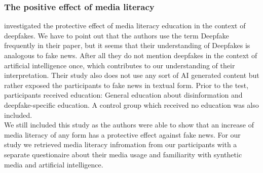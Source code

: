 \documentclass[
  a4paper,  %
  twoside,  %
  bibliography=totoc,
  headsepline,
  cleardoublepage=empty,
  parskip=half,
  draft=false
]{scrbook}
\begin{document}
\subsubsection*{The positive effect of media literacy}
\citeauthor{hwangEffectsDisinformationUsing2021} investigated the protective effect of media literacy education in the context of deepfakes. We have to point out that the authors use the term Deepfake frequently in their paper, but it seems that their understanding of Deepfakes is analogous to fake news. After all they do not mention deepfakes in the context of artificial intelligence once, which contributes to our understanding of their interpretation. Their study also does not use any sort of AI generated content but rather exposed the participants to fake news in textual form. Prior to the test, participants received education: General education about disinformation and deepfake-specific education. A control group which received no education was also included. \\
We still included this study as the authors were able to show that an increase of media literacy of any form has a protective effect against fake news. For our study we retrieved media literacy infromation from our participants with a separate questionaire about their media usage and familiarity with synthetic media and artificial intelligence.
\end{document}
